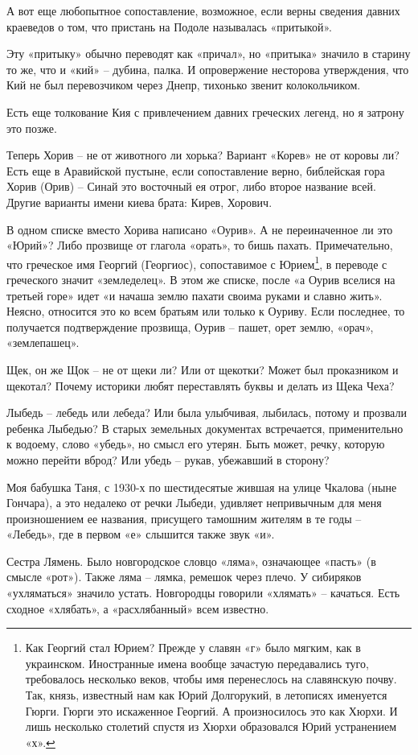 А вот еще любопытное сопоставление, возможное, если верны сведения давних краеведов о том, что пристань на Подоле называлась «притыкой».

Эту «притыку» обычно переводят как «причал», но «притыка» значило в старину то же, что и «кий» – дубина, палка. И опровержение несторова утверждения, что Кий не был перевозчиком через Днепр, тихонько звенит колокольчиком.

Есть еще толкование Кия с привлечением давних греческих легенд, но я затрону это позже.

Теперь Хорив – не от животного ли хорька? Вариант «Корев» не от коровы ли? Есть еще в Аравийской пустыне, если сопоставление верно, библейская гора Хорив (Орив) – Синай это восточный ея отрог, либо второе название всей. Другие варианты имени киева брата: Кирев, Хорович.

В одном списке вместо Хорива написано «Оурив». А не переиначенное ли это «Юрий»? Либо прозвище от глагола «орать», то бишь пахать. Примечательно, что греческое имя Георгий (Георгиос), сопоставимое с Юрием\footnote{Как Георгий стал Юрием? Прежде у славян «г» было мягким, как в украинском. Иностранные имена вообще зачастую передавались туго, требовалось несколько веков, чтобы имя перенеслось на славянскую почву. Так, князь, известный нам как Юрий Долгорукий, в летописях именуется Гюрги. Гюрги это искаженное Георгий. А произносилось это как Хюрхи. И лишь несколько столетий спустя из Хюрхи образовался Юрий устранением «х».}, в переводе с греческого значит «земледелец». В этом же списке, после «а Оурив вселися на третьей горе» идет «и начаша землю пахати своима руками и славно жить». Неясно, относится это ко всем братьям или только к Оуриву. Если последнее, то получается подтверждение прозвища, Оурив – пашет, орет землю, «орач», «землепашец».

Щек, он же Щок – не от щеки ли? Или от щекотки? Может был проказником и щекотал? Почему историки любят переставлять буквы и делать из Щека Чеха?

Лыбедь – лебедь или лебеда? Или была улыбчивая, лыбилась, потому и прозвали ребенка Лыбедью? В старых земельных документах встречается, применительно к водоему, слово «убедь», но смысл его утерян. Быть может, речку, которую можно перейти вброд? Или убедь – рукав, убежавший в сторону?

Моя бабушка Таня, с 1930-х по шестидесятые жившая на улице Чкалова (ныне Гончара), а это недалеко от речки Лыбеди, удивляет непривычным для меня произношением ее названия, присущего тамошним жителям в те годы – «Лебедь», где в первом «е» слышится также звук «и».

Сестра Лямень. Было новгородское словцо «ляма», означающее «пасть» (в смысле «рот»). Также ляма – лямка, ремешок через плечо. У сибиряков «ухляматься» значило устать. Новгородцы говорили «хлямать» – качаться. Есть сходное «хлябать», а «расхлябанный» всем известно.
